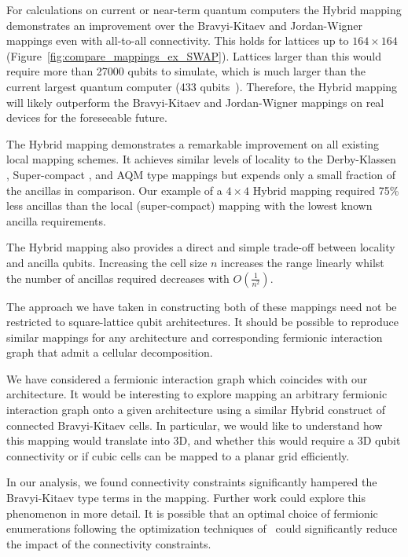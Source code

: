For calculations on current or near-term quantum computers the Hybrid mapping demonstrates an improvement over the Bravyi-Kitaev and Jordan-Wigner mappings even with all-to-all connectivity. This holds for lattices up to $164 \times 164$ (Figure~\ref{fig:compare_mappings_ex_SWAP}). Lattices larger than this would require more than 27000 qubits to simulate, which is much larger than the current largest quantum computer (433 qubits~\cite{gambetta2020ibm}). Therefore, the Hybrid mapping will likely outperform the Bravyi-Kitaev and Jordan-Wigner mappings on real devices for the foreseeable future.

The Hybrid\+ mapping demonstrates a remarkable improvement on all existing local mapping schemes. It achieves similar levels of locality to the Derby-Klassen \cite{derby2021compact}, Super-compact \cite{chen2022equivalence}, and  AQM \cite{steudtner2019quantum} type mappings but expends only a small fraction of the ancillas in comparison. Our example of a $4 \times 4$ Hybrid\+ mapping required 75\% less ancillas than the local (super-compact) mapping with the lowest known ancilla requirements.

The Hybrid\+ mapping also provides a direct and simple trade-off between locality and ancilla qubits. Increasing the cell size $n$ increases the range linearly whilst the number of ancillas required decreases with $O(\frac{1}{n^2})$.

The approach we have taken in constructing both of these mappings need not be restricted to square-lattice qubit architectures. It should be possible to reproduce similar mappings for any architecture and corresponding fermionic interaction graph that admit a cellular decomposition.

We have considered a fermionic interaction graph which coincides with our architecture. It would be interesting to explore mapping an arbitrary fermionic interaction graph onto a given architecture using a similar Hybrid construct of connected Bravyi-Kitaev cells. In particular, we would like to understand how this mapping would translate into 3D, and whether this would require a 3D qubit connectivity or if cubic cells can be mapped to a planar grid efficiently.

In our analysis, we found connectivity constraints significantly hampered the Bravyi-Kitaev type terms in the mapping. Further work could explore this phenomenon in more detail. It is possible that an optimal choice of fermionic enumerations following the optimization techniques of~\cite{chiew2021optimal} could significantly reduce the impact of the connectivity constraints.

